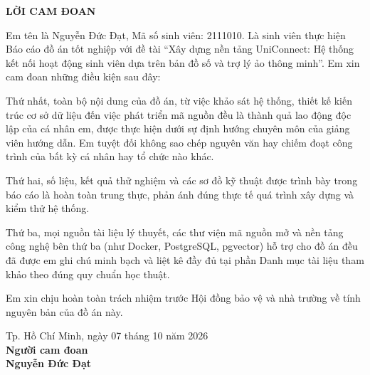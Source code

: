 \begin{center}
    \Large{\textbf{LỜI CAM ĐOAN}}
\end{center}

Em tên là Nguyễn Đức Đạt, Mã số sinh viên: 2111010. Là sinh viên thực hiện Báo cáo đồ án tốt nghiệp với đề tài “Xây dựng nền tảng UniConnect: Hệ thống kết nối hoạt động sinh viên dựa trên bản đồ số và trợ lý ảo thông minh”. Em xin cam đoan những điều kiện sau đây:

Thứ nhất, toàn bộ nội dung của đồ án, từ việc khảo sát hệ thống, thiết kế kiến trúc cơ sở dữ liệu đến việc phát triển mã nguồn đều là thành quả lao động độc lập của cá nhân em, được thực hiện dưới sự định hướng chuyên môn của giảng viên hướng dẫn. Em tuyệt đối không sao chép nguyên văn hay chiếm đoạt công trình của bất kỳ cá nhân hay tổ chức nào khác.

Thứ hai, số liệu, kết quả thử nghiệm và các sơ đồ kỹ thuật được trình bày trong báo cáo là hoàn toàn trung thực, phản ánh đúng thực tế quá trình xây dựng và kiểm thử hệ thống.

Thứ ba, mọi nguồn tài liệu lý thuyết, các thư viện mã nguồn mở và nền tảng công nghệ bên thứ ba (như Docker, PostgreSQL, pgvector) hỗ trợ cho đồ án đều đã được em ghi chú minh bạch và liệt kê đầy đủ tại phần Danh mục tài liệu tham khảo theo đúng quy chuẩn học thuật.

Em xin chịu hoàn toàn trách nhiệm trước Hội đồng bảo vệ và nhà trường về tính nguyên bản của đồ án này.

\vspace{1cm}
\begin{flushright}
    Tp. Hồ Chí Minh, ngày 07 tháng 10 năm 2026 \\
    \textbf{Người cam đoan} \\[1.8cm]
    \textbf{Nguyễn Đức Đạt}
\end{flushright}
